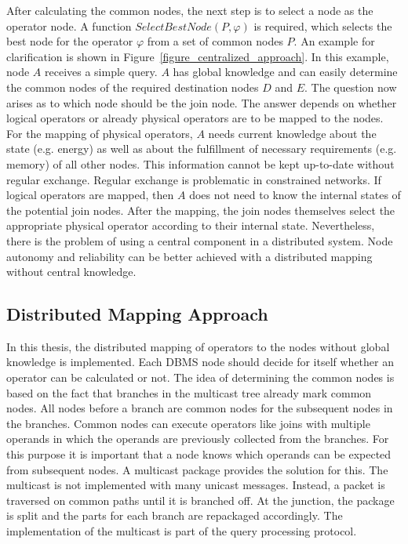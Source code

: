 \documentclass[english,version-2019-11]{uzl-thesis}
\begin{document}
After calculating the common nodes, the next step is to select a node as the operator node. A function $SelectBestNode (P, \varphi)$ is required, which selects the best node for the operator $\varphi$ from a set of common nodes $P$. An example for clarification is shown in Figure~\ref{figure_centralized_approach}. In this example, node $A$ receives a simple query. $A$ has global knowledge and can easily determine the common nodes of the required destination nodes $D$ and $E$.
The question now arises as to which node should be the join node.
The answer depends on whether logical operators or already physical operators are to be mapped to the nodes. For the mapping of physical operators, $A$ needs current knowledge about the state (e.g. energy) as well as about the fulfillment of necessary requirements (e.g. memory) of all other nodes. This information cannot be kept up-to-date without regular exchange. Regular exchange is problematic in constrained networks. If logical operators are mapped, then $A$ does not need to know the internal states of the potential join nodes. After the mapping, the join nodes themselves select the appropriate physical operator according to their internal state. Nevertheless, there is the problem of using a central component in a distributed system. Node autonomy and reliability can be better achieved with a distributed mapping without central knowledge.

\subsection{Distributed Mapping Approach}
In this thesis, the distributed mapping of operators to the nodes without global knowledge is implemented. Each DBMS node should decide for itself whether an operator can be calculated or not. The idea of determining the common nodes is based on the fact that branches in the multicast tree already mark common nodes. All nodes before a branch are common nodes for the subsequent nodes in the branches. Common nodes can execute operators like joins with multiple operands in which the operands are previously collected from the branches. For this purpose it is important that a node knows which operands can be expected from subsequent nodes. A multicast package provides the solution for this. The multicast is not implemented with many unicast messages. Instead, a packet is traversed on common paths until it is branched off. At the junction, the package is split and the parts for each branch are repackaged accordingly. The implementation of the multicast is part of the query processing protocol.
\end{document}
